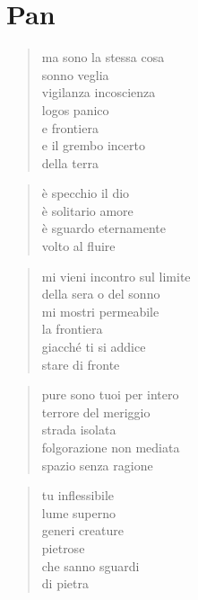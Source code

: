 \chapter*{Pan}


\begin{verse}
    ma sono la stessa cosa\\
    sonno veglia\\
    vigilanza incoscienza\\
    logos panico\\
    e frontiera\\
    e il grembo incerto\\
    della terra
\end{verse}

\clearpage


\begin{verse}
    è specchio il dio\\
    è solitario amore\\
    è sguardo eternamente\\
    volto al fluire
\end{verse}

\clearpage


\begin{verse}
    mi vieni incontro sul limite\\
    della sera o del sonno\\
    mi mostri permeabile\\
    la frontiera\\
    giacché ti si addice\\
    stare di fronte
\end{verse}

\begin{verse}
    pure sono tuoi per intero\\
    terrore del meriggio\\
    strada isolata\\
    folgorazione non mediata\\
    spazio senza ragione
\end{verse}

\begin{verse}
    tu inflessibile\\
    lume superno\\
    generi creature\\
    pietrose\\
    che sanno sguardi\\
    di pietra
\end{verse}

